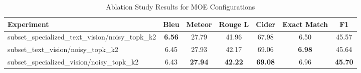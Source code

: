 \begin{table}[h]
\centering
\caption{Ablation Study Results for MOE Configurations}
\label{tab:ablation}
\begin{tabular}{lcccccc}
\toprule
Experiment & Bleu & Meteor & Rouge L & Cider & Exact Match & F1 \\
\midrule
subset\_specialized\_text\_vision/noisy\_topk\_k2 & \textbf{6.56} & 27.79 & 41.96 & 67.98 & 6.50 & 45.57 \\
subset\_text\_vision/noisy\_topk\_k2 & 6.45 & 27.93 & 42.17 & 69.06 & \textbf{6.98} & 45.64 \\
subset\_specialized\_vision/noisy\_topk\_k2 & 6.43 & \textbf{27.94} & \textbf{42.22} & \textbf{69.08} & 6.96 & \textbf{45.70} \\
\bottomrule
\end{tabular}
\end{table}